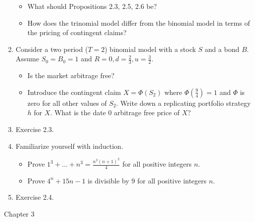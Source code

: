 \documentclass[12pt]{article}
\begin{document}
\begin{enumerate}
  \begin{itemize}
    \item What should Propositions 2.3, 2.5, 2.6 be?
    \item How does the trinomial model differ from the binomial model in terms of the pricing of contingent claims?
  \end{itemize}
  \item Consider a two period ($T = 2$) binomial model with a stock $S$ and a bond $B$. Assume $S_0 = B_0 = 1$ and $R = 0, d = \frac{2}{3}, u = \frac{3}{2}$.
  \begin{itemize}
    \item Is the market arbitrage free?
    \item Introduce the contingent claim $X = \Phi(S_2)$ where $\Phi(\frac{9}{4}) = 1$ and $\Phi$ is zero for all other values of $S_2$. Write down a replicating portfolio strategy $h$ for $X$. What is the date 0 arbitrage free price of $X$?
  \end{itemize}
  \item Exercise 2.3.
  \item Familiarize yourself with induction.
  \begin{itemize}
    \item Prove $1^3 + \ldots + n^3 = \frac{n^2(n+1)^2}{4}$ for all positive integers $n$.
    \item Prove $4^n + 15n - 1$ is divisible by 9 for all positive integers $n$.
  \end{itemize}
  \item Exercise 2.4.
\end{enumerate}

Chapter 3
\end{document}
